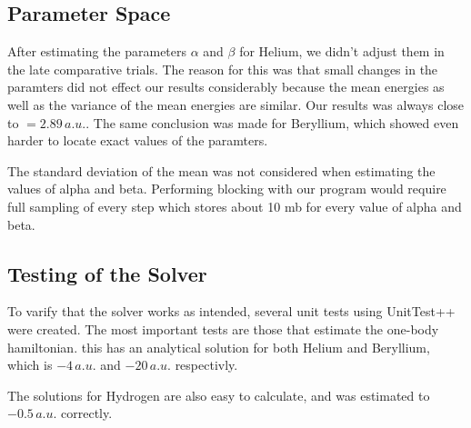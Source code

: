 \documentclass[twocolumn]{article}[10pt]
\begin{document}
\subsection{Parameter Space}
After estimating the parameters $\alpha$ and $\beta$ for 
Helium, we didn't adjust them in the late comparative trials. The reason
for this was that small changes in the paramters did not effect
our results considerably because the mean energies as well as the variance of the mean energies are similar. Our results was always close to 
$=2.89\,a.u.$. The same conclusion was made for Beryllium, which
showed even harder to locate exact values of the paramters.  

The standard deviation of the mean was not considered when estimating the values 
of alpha and beta. Performing blocking with our program would require full 
sampling of every step which stores about 10 mb for every value of alpha and 
beta. 
\subsection{Testing of the Solver}
To varify that the solver works as intended, several unit tests
using UnitTest++ were created. The most important tests 
are those that estimate the one-body hamiltonian. this has
an analytical solution for both Helium and Beryllium, which is $-4\,a.u.$
and $-20\,a.u.$ respectivly. 

The solutions for Hydrogen are also easy to calculate, and was estimated
to $-0.5\,a.u.$ correctly.
\end{document}
